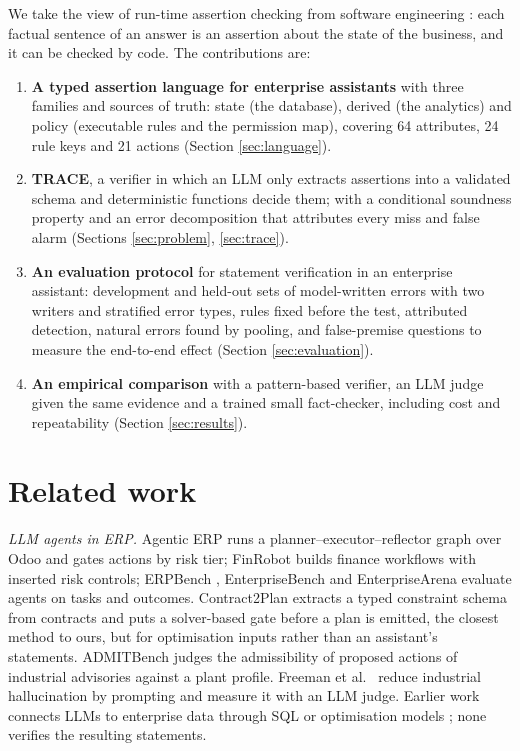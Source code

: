 \documentclass[journal]{IEEEtran}
\renewcommand{\paragraph}[1]{\par\textit{#1}\enspace}
\begin{document}
We take the view of run-time assertion checking from software engineering
\cite{meyer1992contract, clarke2006rac}: each factual sentence of an answer is an assertion about the
state of the business, and it can be checked by code. The contributions are:
\begin{enumerate}
\item \textbf{A typed assertion language for enterprise assistants} with three families and sources of
truth: state (the database), derived (the analytics) and policy (executable rules and the permission map),
covering 64 attributes, 24 rule keys and 21 actions (Section \ref{sec:language}).
\item \textbf{TRACE}, a verifier in which an LLM only extracts assertions into a validated schema and
deterministic functions decide them; with a conditional soundness property and an error decomposition
that attributes every miss and false alarm (Sections \ref{sec:problem}, \ref{sec:trace}).
\item \textbf{An evaluation protocol} for statement verification in an enterprise assistant: development
and held-out sets of model-written errors with two writers and stratified error types, rules fixed before
the test, attributed detection, natural errors found by pooling, and false-premise
questions to measure the end-to-end effect (Section \ref{sec:evaluation}).
\item \textbf{An empirical comparison} with a pattern-based verifier, an LLM judge given the same evidence
and a trained small fact-checker, including cost and repeatability (Section \ref{sec:results}).
\end{enumerate}

\section{Related work}
\label{sec:related}

\paragraph{LLM agents in ERP.} Agentic ERP \cite{liu2026agenticerp} runs a planner--executor--reflector
graph over Odoo and gates actions by risk tier; FinRobot \cite{yang2025finrobot} builds finance workflows
with inserted risk controls; ERPBench \cite{zhang2026erpbench}, EnterpriseBench
\cite{vishwakarma2025enterprisebench} and EnterpriseArena \cite{han2026cfo} evaluate agents on tasks and
outcomes. Contract2Plan \cite{agarwal2026contract2plan} extracts a typed constraint schema from contracts
and puts a solver-based gate before a plan is emitted, the closest method to ours, but for optimisation
inputs rather than an assistant's statements. ADMITBench \cite{misra2026admitbench} judges the admissibility
of proposed actions of industrial advisories against a plant profile. Freeman et al.\
\cite{freeman2026epistemic} reduce industrial hallucination by prompting and measure it with an LLM judge.
Earlier work connects LLMs to enterprise data through SQL \cite{ruizgomez2025erp, sequeda2023kg,
lei2025spider2, li2023bird} or optimisation models \cite{li2023optiguide}; none verifies the resulting
statements.
\end{document}
